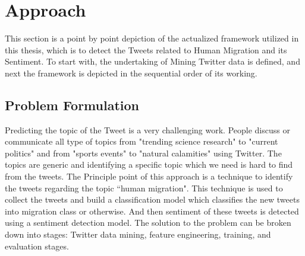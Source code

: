 \chapter{Approach}\label{chap:approach}
This section is a point by point depiction of the actualized framework utilized in this thesis, which is to detect the Tweets related to Human Migration  and its Sentiment. To start with, the undertaking of Mining Twitter data is defined, and next the framework is depicted in the sequential order of its working.

\section{Problem Formulation}

Predicting the topic of the Tweet is a very challenging work. People discuss or communicate all type of topics from "trending science research" to "current politics" and from "sports events" to "natural calamities" using Twitter. The topics are generic and identifying a specific topic which we need is hard to find from the tweets. The  
Principle point of this approach is a technique to identify the tweets regarding the topic ``human migration". This technique is used to  collect the tweets and build a classification model which classifies the new tweets into migration class or otherwise. And then sentiment of these tweets is detected using a sentiment detection model. The solution to the problem can be broken down into stages: Twitter data mining, feature engineering, training, and evaluation stages.


